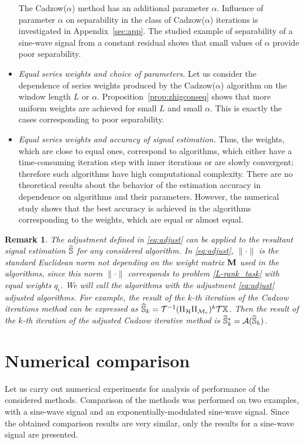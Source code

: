 \documentclass[sii]{ipart}
\newtheorem{remark}{Remark}
\begin{document}
\begin{itemize}
The Cadzow($\alpha$) method has an additional parameter $\alpha$.
Influence of parameter $\alpha$ on separability in the class of Cadzow($\alpha$) iterations is investigated in Appendix~\ref{sec:app}.
 The studied example of separability of a sine-wave signal from a constant residual shows that small values of $\alpha$ provide poor separability.
        \item \textit{Equal series weights and choice of parameters.}
        Let us consider the dependence of series weights produced by the Cadzow($\alpha$) algorithm on the window length $L$ or $\alpha$. Proposition~\ref{prop:zhigconseq} shows that more uniform weights are achieved for small $L$ and small $\alpha$. This is exactly
        the cases corresponding to poor separability.
 		\item \textit{Equal series weights and accuracy of signal estimation.}
 Thus, the weights, which are close to equal ones, correspond to algorithms, which either have a time-consuming iteration step with inner iterations or are slowly convergent; therefore such algorithms have high computational complexity.
There are no theoretical results about the behavior of the estimation accuracy in dependence on algorithms and their parameters. However, the numerical study shows that the best accuracy is achieved in the algorithms corresponding to the weights, which are equal or almost equal.	 \end{itemize}
	
	\begin{remark}
		\label{rem:adjust}
		The adjustment defined in \eqref{eq:adjust} can be applied to the resultant signal estimation $\widehat{\mathbb{S}}$ for any considered algorithm. In \eqref{eq:adjust}, $\|\cdot\|$ is the standard Euclidean norm not depending on the weight matrix $\mathbf{M}$ used in the algorithms, since this norm $\|\cdot\|$ corresponds to problem \eqref{L-rank_task} with equal weights $q_i$. We will call the algorithms with the adjustment \eqref{eq:adjust} adjusted algorithms. For example, the result of the $k$-th iteration of the Cadzow iterations method can be expressed as $\widehat{\mathbb{S}}_k = \mathcal{T}^{-1}(\Pi_{\mathcal{H}} \Pi_{\mathcal{M}_r})^k \mathcal{T} \mathbb{X}$. Then the result of the $k$-th iteration of the adjusted Cadzow iterative method is $\widehat{\mathbb{S}}_k^*=\mathcal{A}(\widehat{\mathbb{S}}_k)$.
	\end{remark}

\section{Numerical comparison}
\label{sec:simul}
Let us carry out numerical experiments for analysis of performance of the considered methods. Comparison of the methods was performed on two examples, with a sine-wave signal and an exponentially-modulated sine-wave signal.
Since the obtained comparison results are very similar, only the results for a sine-wave signal are presented.
\end{document}
